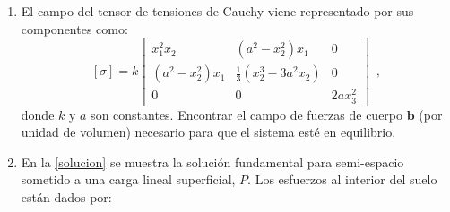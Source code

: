 \documentclass[../notas medios.tex]{subfiles}
\begin{document}
\begin{enumerate}
	\begin{enumerate}
		\item Despreciando las fuerzas de cuerpo \textquestiondown est\'a el cuerpo en equilibrio?
		\item Determinar el vector tensi\'on que act\'ua en un punto $(1,2,3)$ seg\'un el plano $x_1+x_2+x_3=6$;
		\item Determinar la proyecci\'on del vector tensi\'on seg\'un la direcci\'on normal y tangencial al plano $x_1 +x_2 +x_3 = 6$.
	\end{enumerate}


\item \label{punto07} El campo del tensor de tensiones de Cauchy viene
representado por sus componentes como:
		\[[\sigma] = k\left[ \begin{array}{ccc}
		x_1^2 x_2 & (a^2-x_2^2)x_1 & 0 \\ 
		(a^2-x_2^2)x_1 & \frac{1}{3}(x_2^3 - 3a^2 x_2) & 0 \\ 
		0 & 0 & 2ax_3^2
		\end{array}  \right] \enspace,\]
%	
	donde $k$ y $a$ son constantes.
%
	Encontrar el campo de fuerzas de cuerpo $\mathbf{b}$ (por unidad de volumen) necesario para que el sistema est\'e en equilibrio.
%
\item \label{punto11} En la \cref{solucion} se muestra la solución fundamental para semi-espacio
sometido a una carga lineal superficial, $P$. Los esfuerzos al interior del suelo est\'an dados por: \\


\end{enumerate}
\end{document}
